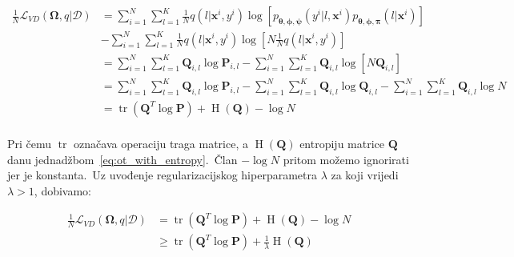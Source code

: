 \documentclass[diplomskirad]{fer}
\begin{document}
\begin{equation}
  \begin{aligned}
    \frac{1}{N} \mathcal{L}_{VD}(\bm{\Omega}, q | \mathcal{D}) &= \sum_{i=1}^{N} \sum_{l=1}^{K} \frac{1}{N} q(l | \bm{x}^i, y^i) \log \left[p_{\bm{\theta}, \bm{\phi}, \bm{\psi}}(y^i | l, \bm{x}^i) p_{\bm{\theta}, \bm{\phi}, \bm{\pi}}(l | \bm{x}^i) \right] \\ 
                                                               &- \sum_{i=1}^{N} \sum_{l=1}^{K} \frac{1}{N} q(l | \bm{x}^i, y^i) \log \left[N \frac{1}{N} q(l | \bm{x}^i, y^i) \right] \\ 
                                                               &= \sum_{i=1}^{N} \sum_{l=1}^{K} \bm{Q}_{i, l} \log \bm{P}_{i, l} - \sum_{i=1}^{N} \sum_{l=1}^{K} \bm{Q}_{i, l} \log \left[N \bm{Q}_{i, l} \right] \\ 
                                                               &= \sum_{i=1}^{N} \sum_{l=1}^{K} \bm{Q}_{i, l} \log \bm{P}_{i, l} - \sum_{i=1}^{N} \sum_{l=1}^{K} \bm{Q}_{i, l} \log \bm{Q}_{i, l} - \sum_{i=1}^{N} \sum_{l=1}^{K} \bm{Q}_{i, l} \log N \\ 
                                                               &= \operatorname{tr}(\bm{Q}^T \log \bm{P}) + \operatorname{H}(\bm{Q}) - \log N \\ 
  \end{aligned}
  \label{eq:vibe_e_step_matrices}
\end{equation}

Pri čemu $\operatorname{tr}$ označava operaciju traga matrice, a $\operatorname{H}(\bm{Q})$ entropiju matrice $\bm{Q}$ danu jednadžbom~\ref{eq:ot_with_entropy}.\ Član $- \log N$ pritom možemo ignorirati jer je konstanta.\ 
Uz uvođenje regularizacijskog hiperparametra $\lambda$ za koji vrijedi $\lambda > 1$, dobivamo:

\begin{equation}
  \begin{aligned}
    \frac{1}{N} \mathcal{L}_{VD}(\bm{\Omega}, q | \mathcal{D}) &= \operatorname{tr}(\bm{Q}^T \log \bm{P}) + \operatorname{H}(\bm{Q}) - \log N \\ 
                                                               &\geq \operatorname{tr}(\bm{Q}^T \log \bm{P}) + \frac{1}{\lambda} \operatorname{H}(\bm{Q}) \\ 
  \end{aligned}
  \label{eq:vibe_e_step_final_eq}
\end{equation}
\end{document}
